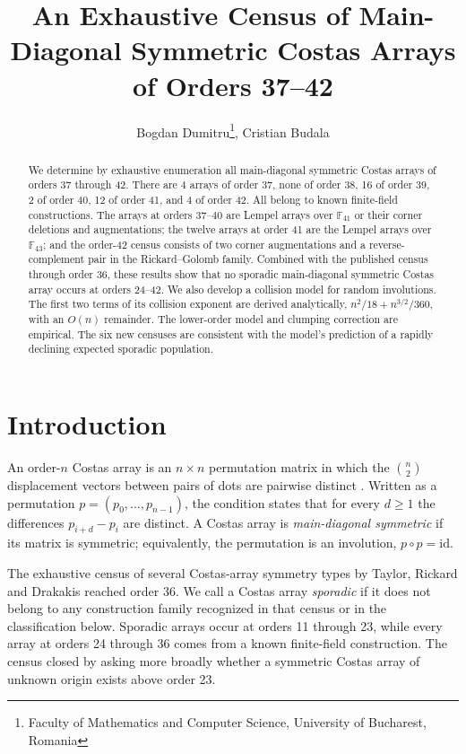 \documentclass[11pt]{article}
\title{An Exhaustive Census of Main-Diagonal Symmetric Costas Arrays of Orders 37--42}
\author{Bogdan Dumitru\thanks{Faculty of Mathematics and Computer Science, University of Bucharest, Romania},
Cristian Budala\footnotemark[1]}
\date{}
\begin{document}
\maketitle

\begin{abstract}
We determine by exhaustive enumeration all main-diagonal symmetric Costas
arrays of orders 37 through 42.  There are 4 arrays of order 37, none of
order 38, 16 of order 39, 2 of order 40, 12 of order 41, and 4 of order
42.  All belong to known finite-field constructions.  The arrays at
orders 37--40 are Lempel
arrays over $\mathbb{F}_{41}$ or their corner deletions and augmentations;
the twelve arrays at order 41 are the Lempel arrays over
$\mathbb{F}_{43}$; and the order-42 census consists of two corner
augmentations and a reverse-complement pair in the Rickard--Golomb family.
Combined with the published census through order 36, these results
show that no sporadic main-diagonal symmetric Costas array occurs at
orders 24--42.  We also develop a collision model for random involutions.
The first two terms of its collision exponent are derived analytically,
$n^2/18+n^{3/2}/360$, with an $O(n)$ remainder.  The lower-order model
and clumping correction are empirical.  The six new censuses are
consistent with the model's prediction of a rapidly declining expected
sporadic population.
\end{abstract}

\section{Introduction}
\label{sec:intro}

An order-$n$ Costas array is an $n\times n$ permutation matrix in which the
$\binom{n}{2}$ displacement vectors between pairs of dots are pairwise
distinct \cite{Costas1984,GolombTaylor1984,Drakakis2006Review}.  Written as
a permutation $p=(p_0,\ldots,p_{n-1})$, the condition states that for every
$d\geq 1$ the differences $p_{i+d}-p_i$ are distinct.  A Costas array is
\emph{main-diagonal symmetric} if its matrix is symmetric; equivalently,
the permutation is an involution, $p\circ p=\mathrm{id}$.

The exhaustive census of several Costas-array symmetry types by Taylor,
Rickard and Drakakis \cite{RickardDrakakis2009Symmetry} reached order 36.
We call a Costas array \emph{sporadic} if it does not belong to any
construction family recognized in that census or in the classification below.
Sporadic arrays occur at orders 11 through 23, while
every array at orders 24 through 36 comes from a known finite-field
construction.  The census closed by asking more broadly whether a symmetric
Costas array of unknown origin exists above order 23.
\end{document}
